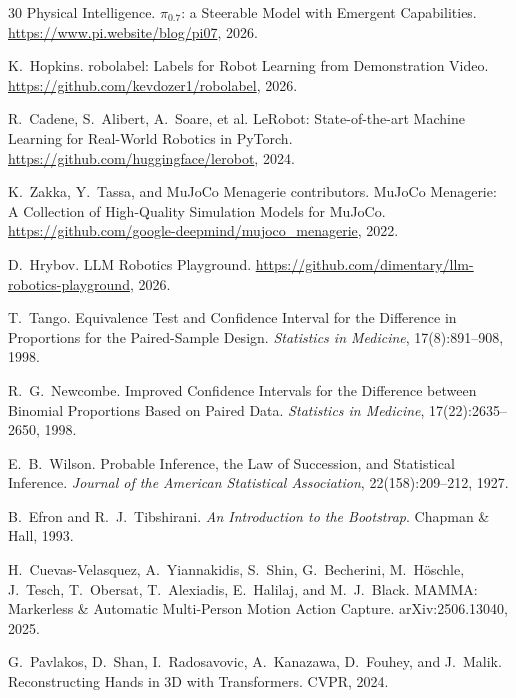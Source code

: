 \documentclass[11pt]{article}
\begin{document}
\begin{thebibliography}{30}
Physical Intelligence.
\newblock $\pi_{0.7}$: a Steerable Model with Emergent Capabilities.
\newblock \url{https://www.pi.website/blog/pi07}, 2026.

K.\ Hopkins.
\newblock robolabel: Labels for Robot Learning from Demonstration Video.
\newblock \url{https://github.com/kevdozer1/robolabel}, 2026.

R.\ Cadene, S.\ Alibert, A.\ Soare, et al.
\newblock LeRobot: State-of-the-art Machine Learning for Real-World Robotics in PyTorch.
\newblock \url{https://github.com/huggingface/lerobot}, 2024.

K.\ Zakka, Y.\ Tassa, and MuJoCo Menagerie contributors.
\newblock MuJoCo Menagerie: A Collection of High-Quality Simulation Models for MuJoCo.
\newblock \url{https://github.com/google-deepmind/mujoco_menagerie}, 2022.

D.\ Hrybov.
\newblock LLM Robotics Playground.
\newblock \url{https://github.com/dimentary/llm-robotics-playground}, 2026.

T.\ Tango.
\newblock Equivalence Test and Confidence Interval for the Difference in Proportions for the Paired-Sample Design.
\newblock \emph{Statistics in Medicine}, 17(8):891--908, 1998.

R.\ G.\ Newcombe.
\newblock Improved Confidence Intervals for the Difference between Binomial Proportions Based on Paired Data.
\newblock \emph{Statistics in Medicine}, 17(22):2635--2650, 1998.

E.\ B.\ Wilson.
\newblock Probable Inference, the Law of Succession, and Statistical Inference.
\newblock \emph{Journal of the American Statistical Association}, 22(158):209--212, 1927.

B.\ Efron and R.\ J.\ Tibshirani.
\newblock \emph{An Introduction to the Bootstrap}.
\newblock Chapman \& Hall, 1993.

H.\ Cuevas-Velasquez, A.\ Yiannakidis, S.\ Shin, G.\ Becherini, M.\ H\"oschle, J.\ Tesch, T.\ Obersat, T.\ Alexiadis, E.\ Halilaj, and M.\ J.\ Black.
\newblock MAMMA: Markerless \& Automatic Multi-Person Motion Action Capture.
\newblock arXiv:2506.13040, 2025.

G.\ Pavlakos, D.\ Shan, I.\ Radosavovic, A.\ Kanazawa, D.\ Fouhey, and J.\ Malik.
\newblock Reconstructing Hands in 3D with Transformers.
\newblock CVPR, 2024.

\end{thebibliography}
\end{document}
